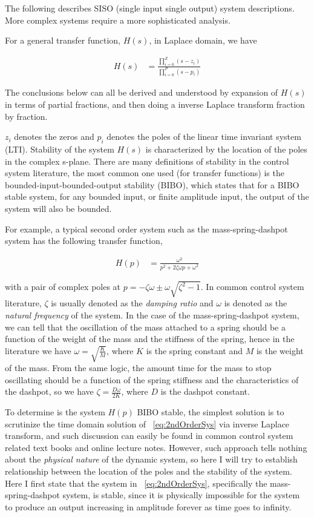 \documentclass[12pt]{article}
\begin{document}
The following describes SISO (single input single output) system descriptions.
More complex systems require a more sophisticated analysis.

For a general transfer function, $H(s)$, in Laplace domain, we have

\begin{align}
  \label{eq:tf}
   H(s) &= \frac{\prod_{i=0}^Z (s - z_i)}{\prod_{i=0}^P (s - p_i)}
\end{align}

The conclusions below can all be derived and understood by expansion of $H(s)$ in 
terms of partial fractions, and then doing a inverse Laplace 
transform fraction by fraction.

$z_i$ denotes the zeros and $p_i$ denotes the poles of the
linear time invariant system (LTI).  Stability of the system $H(s)$ is
characterized by the location of the poles in the complex s-plane.  
There are many definitions
of stability in the control system literature, the most common one
used (for transfer functions) is the bounded-input-bounded-output
stability (BIBO), which states that for a BIBO stable system, for any
bounded input, or finite amplitude input, the output of the system
will also be bounded. 

For example, a typical second order system such as the
mass-spring-dashpot system has the following transfer function,

\begin{align}
  \label{eq:2ndOrderSys}
  H(p) &= \frac{\omega^2}{p^2 + 2\zeta \omega p + \omega^2}
\end{align}

with a pair of complex poles at $p = -\zeta \omega \pm \omega
\sqrt{\zeta^2 -1}$.  In common control system literature, $\zeta$ is
usually denoted as the \emph{damping ratio} and $\omega$ is denoted as
the \emph{natural frequency} of the system.  In the case of the
mass-spring-dashpot system, we can tell that the oscillation of the
mass attached to a spring should be a function of the weight of the
mass and the stiffness of the spring, hence in the literature we have
$\omega = \sqrt{\frac{K}{M}}$, where $K$ is the spring constant and
$M$ is the weight of the mass.  From the same logic, the amount time
for the mass to stop oscillating should be a function of the spring
stiffness and the characteristics of the dashpot, so we have $\zeta =
\frac{D \omega}{2 K}$, where $D$ is the dashpot constant.  

To determine is the system $H(p)$ BIBO stable, the simplest solution
is to scrutinize the time domain solution of ~\ref{eq:2ndOrderSys} via
inverse Laplace transform, and such discussion can easily be found in
common control system related text books and online lecture notes.
However, such approach tells nothing about the \emph{physical nature}
of the dynamic system, so here I will try to establish relationship
between the location of the poles and the stability of the system.
Here I first state that the system in ~\ref{eq:2ndOrderSys},
specifically the mass-spring-dashpot system, is stable,
since it is physically impossible for the system to produce an output
increasing in amplitude forever as time goes to infinity.
\end{document}
